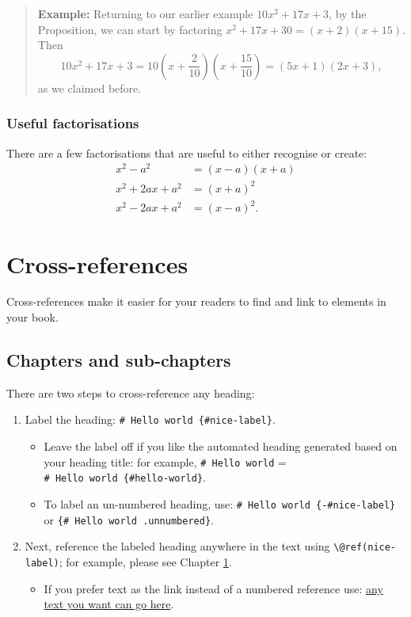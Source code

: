 \documentclass[
]{book}
\providecommand{\tightlist}{%
  \setlength{\itemsep}{0pt}\setlength{\parskip}{0pt}}
\theoremstyle{definition}
\theoremstyle{definition}
\theoremstyle{definition}
\theoremstyle{definition}
\theoremstyle{remark}
\begin{document}
\begin{quote}
\textbf{Example:} Returning to our earlier example \(10x^2 + 17x + 3\), by the Proposition, we can start by factoring \(x^2 + 17x + 30 = (x + 2)(x + 15)\). Then
\[10x^2 + 17x + 3 = 10\left(x + \frac{2}{10}\right)\left(x + \frac{15}{10}\right) = (5x + 1)(2x + 3),\]
as we claimed before.
\end{quote}

\hypertarget{useful-factorisations}{%
\subsection{Useful factorisations}\label{useful-factorisations}}

There are a few factorisations that are useful to either recognise or create:
\[\begin{aligned}
x^2 - a^2 &= (x - a)(x + a) \\
x^2 + 2ax + a^2 &= (x + a)^2 \\
x^2 - 2ax + a^2 &= (x - a)^2.
\end{aligned}\]

\hypertarget{cross}{%
\chapter{Cross-references}\label{cross}}

Cross-references make it easier for your readers to find and link to elements in your book.

\hypertarget{chapters-and-sub-chapters}{%
\section{Chapters and sub-chapters}\label{chapters-and-sub-chapters}}

There are two steps to cross-reference any heading:

\begin{enumerate}
\def\labelenumi{\arabic{enumi}.}
\tightlist
\item
  Label the heading: \texttt{\#\ Hello\ world\ \{\#nice-label\}}.

  \begin{itemize}
  \tightlist
  \item
    Leave the label off if you like the automated heading generated based on your heading title: for example, \texttt{\#\ Hello\ world} = \texttt{\#\ Hello\ world\ \{\#hello-world\}}.
  \item
    To label an un-numbered heading, use: \texttt{\#\ Hello\ world\ \{-\#nice-label\}} or \texttt{\{\#\ Hello\ world\ .unnumbered\}}.
  \end{itemize}
\item
  Next, reference the labeled heading anywhere in the text using \texttt{\textbackslash{}@ref(nice-label)}; for example, please see Chapter \ref{cross}.

  \begin{itemize}
  \tightlist
  \item
    If you prefer text as the link instead of a numbered reference use: \protect\hyperlink{cross}{any text you want can go here}.
  \end{itemize}
\end{enumerate}
\end{document}
